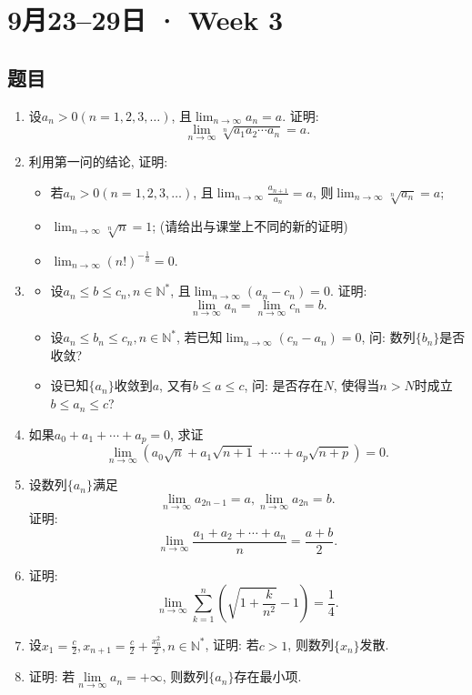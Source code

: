 \documentclass[UTF8,11pt, a4paper, oneside, fontset=none]{ctexbook}
\begin{document}
\clearpage

\section{9月23--29日 · Week 3}

\subsection*{题目}

\begin{enumerate}

\item 设$a_n>0 (n = 1, 2, 3, \ldots)$, 且$\lim_{n \to \infty} a_n =a$. 证明:
\[
\lim_{n \to \infty} \sqrt[n]{a_1 a_2 \cdots a_n} = a.
\]
\item 利用第一问的结论, 证明:
\begin{itemize}
\item[(1)] 若$a_n>0 (n = 1, 2, 3, \ldots)$, 且$\lim_{n \to \infty}\frac{a_{n+1}}{a_n} =a$, 则$\lim_{n \to \infty} \sqrt[n]{a_n} =a$;
\item[(2)] $\lim_{n \to \infty} \sqrt[n]{n} =1$; (请给出与课堂上不同的新的证明)
\item[(3)] $\lim_{n \to \infty} (n!)^{-\frac{1}{n}} =0$.
\end{itemize} 

\item
\begin{itemize}
\item[(1)] 设$a_n \leq b \leq c_n, n \in \mathbb N^*$, 且$\lim_{n \to \infty} (a_n - c_n) =0$. 证明:
\[
\lim_{n \to \infty} a_n = \lim_{n \to \infty} c_n = b.
\]
\item[(2)] 设$a_n \leq b_n \leq c_n, n \in \mathbb N^*$, 若已知$\lim_{n \to \infty}(c_n -a_n) =0$, 问: 数列$\{b_n\}$是否收敛?
\item[(3)] 设已知$\{a_n\}$收敛到$a$, 又有$b \leq a \leq c$, 问: 是否存在$N$, 使得当$n >N$时成立$b \leq a_n \leq c$?
\end{itemize}


\item
如果$a_0 + a_1 + \cdots + a_p =0$, 求证
\[
\lim_{n \to \infty} (a_0 \sqrt n + a_1 \sqrt{n+1} + \cdots + a_p \sqrt{n+p})=0.
\]


\item
设数列$\{a_n\}$满足
\[
\lim_{n \to \infty} a_{2n-1} =a, \lim_{n \to \infty} a_{2n} =b.
\]
证明:
\[
\lim_{n \to \infty} \frac{a_1 + a_2 + \cdots + a_n}{n} = \frac{a+b}{2}.
\]


\item
证明:
\[
\lim_{n \to \infty} \sum_{k=1}^n \left( \sqrt{1 + \frac{k}{n^2} } -1\right) = \frac{1}{4}.
\]


\item 设$x_1 = \frac{c}{2}, x_{n+1} = \frac{c}{2} + \frac{x_n^2}{2}, n \in \mathbb N^*$, 证明: 若$c>1$, 则数列$\{x_n \}$发散.


\item 证明: 若$\lim\limits_{n \to \infty} a_n = +\infty$, 则数列$\{a_n\}$存在最小项.


\end{enumerate}
\end{document}
